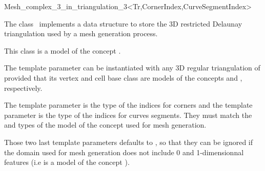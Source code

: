 \ccRefPageBegin


\begin{ccRefClass}{Mesh_complex_3_in_triangulation_3<Tr,CornerIndex,CurveSegmentIndex>}  %


\ccDefinition
  

The class \ccRefName\ implements a data structure 
to store the 3D restricted Delaunay triangulation used by a mesh
generation process.

This class is a model of the concept
.

\ccParameters

The template parameter  can be instantiated with any 3D
regular triangulation of \cgal{} provided that its
vertex and cell base class are models of the concepts
 and , respectively. 

The template parameter  is the type of the indices for corners and
the template parameter  is the type of the indices for curves segments.
They must match the  and  types of the model
of the  concept used for mesh generation.

Those two last template parameters defaults to , so that they can be ignored
if the domain used for mesh generation does not include 0 and 1-dimensionnal features (i.e
is a model of the concept ).



\ccIsModel
{}

\ccTypes


\end{ccRefClass}
